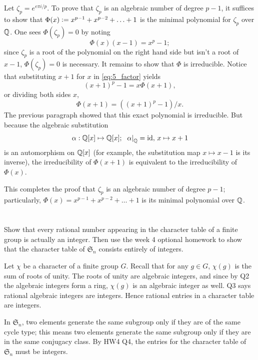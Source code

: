 \documentclass[12pt]{article}
\begin{document}
Let $\zeta_{p} = e^{e\pi i / p}$. 
To prove that $\zeta_{p}$ is an algebraic number of degree $p - 1$, it suffices to show that $\Phi(x) \vcentcolon= x^{p - 1} + x^{p - 2} + \ldots + 1$ is the minimal polynomial for $\zeta_p$ over $\mathbb{Q}$. 
One sees $\Phi(\zeta_p) = 0$ by noting 
\begin{equation} \label{eq:5_factor}
  \Phi(x) (x - 1) = x^p - 1;
\end{equation}
since $\zeta_p$ is a root of the polynomial on the right hand side but isn't a root of $x - 1$, $\Phi(\zeta_p) = 0$ is necessary.   
It remains to show that $\Phi$ is irreducible. 
Notice that substituting $x + 1$ for $x$ in \eqref{eq:5_factor} yields
$$(x + 1)^p - 1 = x \Phi(x + 1),$$
or dividing both sides $x$, 
$$\Phi(x + 1) = ((x + 1)^{p} - 1) / x.$$
The previous paragraph showed that this exact polynomial is irreducible.
But because the algebraic substitution 
$$\alpha: \mathbb{Q}[x] \mapsto \mathbb{Q}[x]; \hspace{0.5em} \left.\alpha\right|_{\mathbb{Q}} = \text{id}, \, x \mapsto x + 1$$ 
is an automorphism on $\mathbb{Q}[x]$ (for example, the substitution map $x \mapsto x - 1$ is its inverse), 
the irreducibility of $\Phi(x + 1)$ is equivalent to the irreducibility of $\Phi(x)$. 

This completes the proof that $\zeta_p$ is an algebraic number of degree $p - 1$; 
particularly, $\Phi(x) = x^{p - 1} + x^{p - 2} + \ldots + 1$ is its minimal polynomial over $\mathbb{Q}$. 
 
\section{}
 
Show that every rational number appearing in the character table of a finite group is actually an integer. 
Then use the week 4 optional homework to show that the character table of $\mathfrak{S}_n$ consists entirely of integers.

\noindent\dotfill 

Let $\chi$ be a character of a finite group $G$. 
Recall that for any $g \in G$, $\chi(g)$ is the sum of roots of unity. 
The roots of unity are algebraic integers, and since by Q2 the algebraic integers form a ring, $\chi(g)$ is an algebraic integer as well. 
Q3 says rational algebraic integers are integers. 
Hence rational entries in a character table are integers. 

In $\mathfrak{S}_n$, two elements generate the same subgroup only if they are of the same cycle type; 
this means two elements generate the same subgroup only if they are in the same conjugacy class. 
By HW4 Q4, the entries for the character table of $\mathfrak{S}_n$ must be integers. 
 
\end{document}
